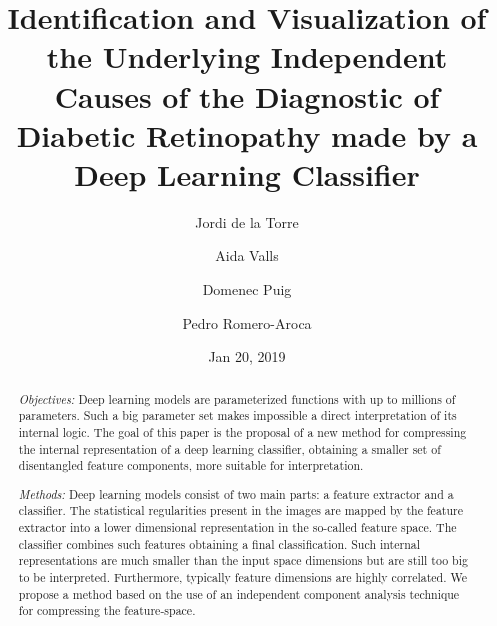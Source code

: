 \documentclass[review]{elsarticle}
\theoremstyle{definition} %
\theoremstyle{remark}
\begin{document}
\begin{frontmatter}

\title{Identification and Visualization of the Underlying Independent Causes of the Diagnostic of Diabetic Retinopathy made by a Deep Learning Classifier}

\author[label1]{Jordi de la Torre}
\address[label1]{Departament d'Enginyeria Inform\`atica i Matem\`atiques.\\Escola T\`ecnica Superior d'Enginyeria.\\Universitat Rovira i Virgili\\Avinguda Paisos Catalans, 26. E-43007\\
	Tarragona, Spain}
\author[label1]{Aida Valls}
\author[label1]{Domenec Puig}
\author[label2]{Pedro Romero-Aroca}





\address[label2]{Ophthalmic Service. University Hospital Sant Joan de Reus\\Institut d’Investigaci\'o Sanit\`aria Pere Virgili (IISPV)\\ Universitat Rovira i Virgili\\Reus (Tarragona)\\Avinguda de la Universitat, 1. E-43204\\Reus, Spain}

\date{Jan 20, 2019}

\begin{abstract}
\emph{Objectives:} Deep learning models are parameterized functions with up to millions of parameters. Such a big parameter set makes impossible a direct interpretation of its internal logic. The goal of this paper is the proposal of a new method for compressing the internal representation of a deep learning classifier, obtaining a smaller set of disentangled feature components, more suitable for interpretation.
 
\emph{Methods:} Deep learning models consist of two main parts: a feature extractor and a classifier. The statistical regularities present in the images are mapped by the feature extractor into a lower dimensional representation in the so-called feature space. The classifier combines such features obtaining a final classification. Such internal representations are much smaller than the input space dimensions but are still too big to be interpreted. Furthermore, typically feature dimensions are highly correlated. We propose a method based on the use of an independent component analysis technique for compressing the feature-space. 


\end{abstract}
\end{frontmatter}
\end{document}
